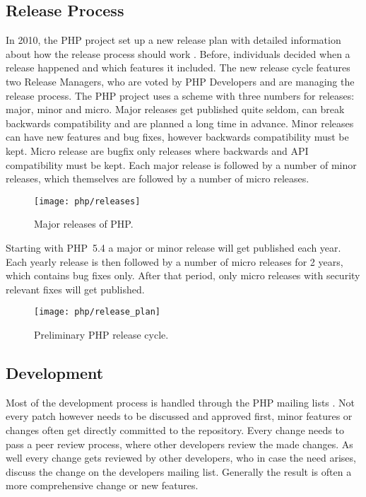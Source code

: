 
\subsection{Release Process} %

In 2010, the PHP project set up a new release plan with detailed information
about how the release process should work \cite{PHPRelease}. Before,
individuals decided when a release happened and which features it included. The
new release cycle features two Release Managers, who are voted by PHP
Developers and are managing the release process. The PHP project uses a scheme
with three numbers for releases: major, minor and micro. Major releases get
published quite seldom, can break backwards compatibility and are planned a
long time in advance. Minor releases can have new features and bug fixes,
however backwards compatibility must be kept. Micro release are bugfix only
releases where backwards and \ac{API} compatibility must be kept. Each major
release is followed by a number of minor releases, which themselves are
followed by a number of micro releases.

\begin{figure}[htbp]
  \centering
  \texttt{[image: php/releases]}
  \caption[Major releases of PHP]{Major releases of PHP.}
\end{figure}

Starting with PHP~5.4 a major or minor release will get published each year.
Each yearly release is then followed by a number of micro releases for 2 years,
which contains bug fixes only. After that period, only micro releases with
security relevant fixes will get published.

\begin{figure}[htbp]
  \centering
  \texttt{[image: php/release\_plan]}
  \caption[Preliminary PHP release cycle]{Preliminary PHP release cycle.}
\end{figure}


\subsection{Development} %

Most of the development process is handled through the PHP mailing lists
\cite{PHPRelease,Magnusson2010,PHPVoting}. Not every patch however needs to be
discussed and approved first, minor features or changes often get directly
committed to the repository. Every change needs to pass a peer review process,
where other developers review the made changes. As well every change gets
reviewed by other developers, who in case the need arises, discuss the change
on the developers mailing list. Generally the result is often a more
comprehensive change or new features.

